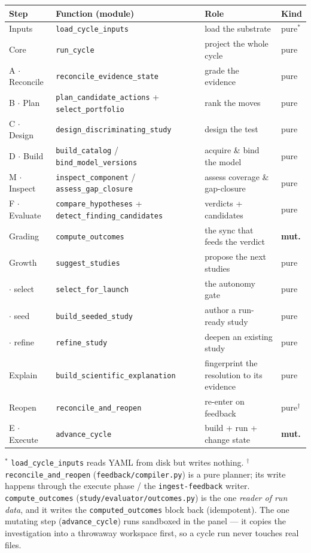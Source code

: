 \documentclass[11pt]{article}
\newcommand{\code}[1]{\texttt{\small #1}}
\begin{document}
\begin{center}\small
\begin{tabular}{@{}llll@{}}
\toprule
\textbf{Step} & \textbf{Function} \scriptsize(module) & \textbf{Role} & \textbf{Kind}\\
\midrule
Inputs      & \code{load\_cycle\_inputs}        & load the substrate        & pure$^{*}$\\
Core        & \code{run\_cycle}                 & project the whole cycle   & pure\\
A $\cdot$ Reconcile & \code{reconcile\_evidence\_state} & grade the evidence  & pure\\
B $\cdot$ Plan      & \code{plan\_candidate\_actions} + \code{select\_portfolio} & rank the moves & pure\\
C $\cdot$ Design    & \code{design\_discriminating\_study} & design the test  & pure\\
D $\cdot$ Build     & \code{build\_catalog} / \code{bind\_model\_versions} & acquire \& bind the model & pure\\
M $\cdot$ Inspect   & \code{inspect\_component} / \code{assess\_gap\_closure} & assess coverage \& gap-closure & pure\\
F $\cdot$ Evaluate  & \code{compare\_hypotheses} + \code{detect\_finding\_candidates} & verdicts + candidates & pure\\
Grading     & \code{compute\_outcomes}          & the sync that feeds the verdict & \textcolor{warn}{\textbf{mut.}}\\
Growth      & \code{suggest\_studies}           & propose the next studies  & pure\\
\quad $\cdot$ select & \code{select\_for\_launch}       & the autonomy gate         & pure\\
\quad $\cdot$ seed   & \code{build\_seeded\_study}      & author a run-ready study   & pure\\
\quad $\cdot$ refine & \code{refine\_study}             & deepen an existing study   & pure\\
Explain     & \code{build\_scientific\_explanation} & fingerprint the resolution to its evidence & pure\\
Reopen      & \code{reconcile\_and\_reopen}     & re-enter on feedback      & pure$^\dagger$\\
E $\cdot$ Execute   & \code{advance\_cycle}             & build + run + change state   & \textcolor{warn}{\textbf{mut.}}\\
\bottomrule
\end{tabular}
\end{center}
{\footnotesize $^{*}$ \code{load\_cycle\_inputs} reads YAML from disk but writes nothing.
$^\dagger$ \code{reconcile\_and\_reopen} (\code{feedback/compiler.py}) is a pure planner; its
write happens through the execute phase / the \code{ingest-feedback} writer. \code{compute\_outcomes}
(\code{study/evaluator/outcomes.py}) is the one \emph{reader of run data}, and it writes the
\code{computed\_outcomes} block back (idempotent). The one mutating step
(\code{advance\_cycle}) runs sandboxed in the panel --- it copies the investigation into a
throwaway workspace first, so a cycle run never touches real files.}
\end{document}
